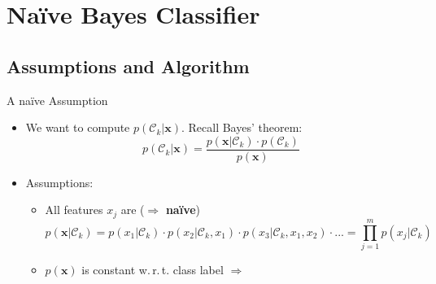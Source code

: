 \section{Na\"{i}ve Bayes Classifier}

\subsection{Assumptions and Algorithm}

\begin{frame}{A na\"{i}ve Assumption}{}
	\begin{itemize}
		\item We want to compute $p(\mathcal{C}_k \vert \bm{x})$. Recall Bayes' theorem:
		\begin{equation}
			p(\mathcal{C}_k \vert \bm{x}) = \frac{p(\bm{x} \vert \mathcal{C}_k) \cdot p(\mathcal{C}_k)}{p(\bm{x})}
		\end{equation}
		\item Assumptions:
		\begin{itemize}
			\item All features $x_j$ are 
				($\Rightarrow$ \textbf{na\"{i}ve})
			\begin{equation}
				p(\bm{x} \vert \mathcal{C}_k) 
					= p(x_1 \vert \mathcal{C}_k) \cdot p(x_2 \vert \mathcal{C}_k, x_1) \cdot
						p(x_3 \vert \mathcal{C}_k, x_1, x_2) \cdot ... 
					= \prod_{j=1}^m p(x_j \vert \mathcal{C}_k)
			\end{equation}
			\item $p(\bm{x})$ is constant w.\,r.\,t. class label
				$\Rightarrow$ 
		\end{itemize}
	\end{itemize}
\end{frame}


